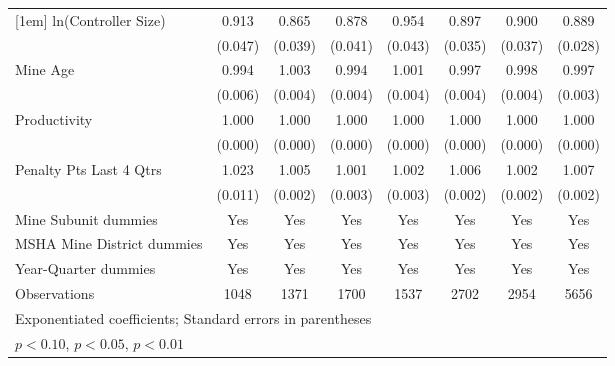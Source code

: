{\begin{tabular}{l*{7}{c}}
[1em]
ln(Controller Size)      &       0.913\sym{*}  &       0.865\sym{***}&       0.878\sym{***}&       0.954         &       0.897\sym{***}&       0.900\sym{**} &       0.889\sym{***}\\
                         &     (0.047)         &     (0.039)         &     (0.041)         &     (0.043)         &     (0.035)         &     (0.037)         &     (0.028)         \\
[1em]
Mine Age                 &       0.994         &       1.003         &       0.994         &       1.001         &       0.997         &       0.998         &       0.997         \\
                         &     (0.006)         &     (0.004)         &     (0.004)         &     (0.004)         &     (0.004)         &     (0.004)         &     (0.003)         \\
[1em]
Productivity             &       1.000\sym{**} &       1.000         &       1.000         &       1.000         &       1.000\sym{**} &       1.000         &       1.000         \\
                         &     (0.000)         &     (0.000)         &     (0.000)         &     (0.000)         &     (0.000)         &     (0.000)         &     (0.000)         \\
[1em]
Penalty Pts Last 4 Qtrs  &       1.023\sym{**} &       1.005\sym{**} &       1.001         &       1.002         &       1.006\sym{***}&       1.002         &       1.007\sym{***}\\
                         &     (0.011)         &     (0.002)         &     (0.003)         &     (0.003)         &     (0.002)         &     (0.002)         &     (0.002)         \\
[1em]
Mine Subunit dummies     &         Yes         &         Yes         &         Yes         &         Yes         &         Yes         &         Yes         &         Yes         \\
[1em]
MSHA Mine District dummies&         Yes         &         Yes         &         Yes         &         Yes         &         Yes         &         Yes         &         Yes         \\
[1em]
Year-Quarter dummies     &         Yes         &         Yes         &         Yes         &         Yes         &         Yes         &         Yes         &         Yes         \\
\hline
Observations             &        1048         &        1371         &        1700         &        1537         &        2702         &        2954         &        5656         \\
\hline\hline
\multicolumn{8}{l}{\footnotesize Exponentiated coefficients; Standard errors in parentheses}\\
\multicolumn{8}{l}{\footnotesize \sym{*} \(p<0.10\), \sym{**} \(p<0.05\), \sym{***} \(p<0.01\)}\\
\end{tabular}
}
